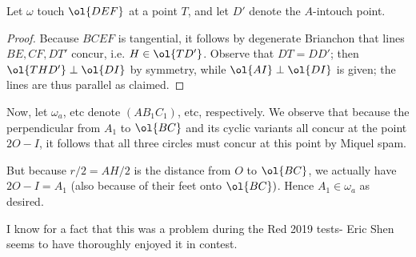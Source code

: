 \documentclass{seto}
\begin{document}
Let $\omega$ touch $\ol{DEF}$ at a point $T$, and let $D'$ denote the $A$-intouch point.
\begin{proof}Because $BCEF$ is tangential, it follows by degenerate Brianchon that lines $BE,CF,DT'$ concur, i.e. $H\in\ol{TD'}$. 
Observe that $DT=DD'$; then $\ol{THD'}\perp\ol{DI}$ by symmetry, 
while $\ol{AI}\perp\ol{DI}$ is given; the lines are thus parallel as claimed.\end{proof}
Now, let $\omega_a$, etc denote $(AB_1C_1)$, etc, 
respectively. We observe that because the perpendicular from $A_1$ to $\ol{BC}$ and its cyclic variants all concur at the point $2O-I$, 
it follows that all three circles must concur at this point by Miquel spam. 

But because $r/2=AH/2$ is the distance from $O$ to $\ol{BC}$, we actually have $2O-I=A_1$ 
(also because of their feet onto $\ol{BC})$. Hence $A_1\in \omega_a$ as desired.

\begin{remark}
I know for a fact that this was a problem during the Red 2019 tests-
Eric Shen seems to have thoroughly enjoyed it in contest.
\end{remark}
\newpage
\end{document}
